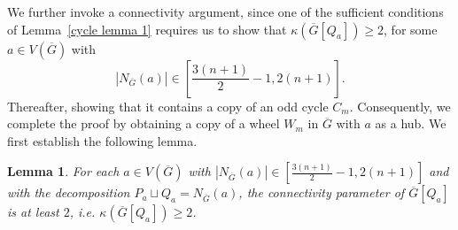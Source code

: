 \documentclass[reqno,10pt]{amsart}
\newtheorem{lemma}[theorem]{Lemma}
\theoremstyle{definition}
\begin{document}
We further invoke a connectivity argument, since one of the sufficient conditions of Lemma~\ref{cycle lemma 1} requires us to show that $\kappa(\overline{G}[Q_{a}])\geq2$, for some $a\in V(\overline{G})$ with 
\begin{equation*}
 |N_{\overline{G}}(a)|\in\left[\frac{3(n+1)}{2}-1, 2(n+1)\right].   
\end{equation*}
Thereafter, showing that it contains a copy of an odd cycle $C_{m}$. Consequently, we complete the proof by obtaining a copy of a wheel $W_{m}$ in $\overline{G}$ with $a$ as a hub. We first establish the following lemma. 

\begin{lemma}\label{connectivity lemma 3}
For each $a\in V(\overline{G})$ with $|N_{\overline{G}}(a)|\in\left[\frac{3(n+1)}{2}-1, 2(n+1)\right]$ and with the decomposition $P_{a}\sqcup Q_{a}=N_{\overline{G}}(a)$, the connectivity parameter of $\overline{G}[Q_{a}]$ is at least $2$, i.e. $\kappa(\overline{G}[Q_{a}])\geq2$.
\end{lemma}
\end{document}
